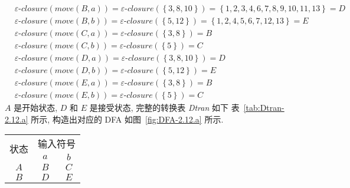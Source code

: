 \documentclass[boxes]{homework}
\begin{document}
\begin{solution}
\begin{align}
         & \varepsilon\textrm{-}closure \left( move \left( B, a\right)\right)
        = \varepsilon\textrm{-}closure \left( \left\{ 3, 8, 10\right\}\right)
        = \left\{ 1, 2, 3, 4, 6, 7, 8, 9, 10, 11, 13\right\} = D                  \\
         & \varepsilon\textrm{-}closure \left( move \left( B, b\right)\right)
        = \varepsilon\textrm{-}closure \left( \left\{ 5, 12\right\}\right)
        = \left\{ 1, 2, 4, 5, 6, 7, 12, 13\right\} = E                            \\
         & \varepsilon\textrm{-}closure \left( move \left( C, a\right)\right)
        = \varepsilon\textrm{-}closure \left( \left\{ 3, 8\right\}\right) = B     \\
         & \varepsilon\textrm{-}closure \left( move \left( C, b\right)\right)
        = \varepsilon\textrm{-}closure \left( \left\{ 5\right\}\right) = C        \\
         & \varepsilon\textrm{-}closure \left( move \left( D, a\right)\right)
        = \varepsilon\textrm{-}closure \left( \left\{ 3, 8, 10\right\}\right) = D \\
         & \varepsilon\textrm{-}closure \left( move \left( D, b\right)\right)
        = \varepsilon\textrm{-}closure \left( \left\{ 5, 12\right\}\right) = E    \\
         & \varepsilon\textrm{-}closure \left( move \left( E, a\right)\right)
        = \varepsilon\textrm{-}closure \left( \left\{ 3, 8\right\}\right) = B     \\
         & \varepsilon\textrm{-}closure \left( move \left( E, b\right)\right)
        = \varepsilon\textrm{-}closure \left( \left\{ 5\right\}\right) = C
    \end{align}
    $A$ 是开始状态, $D$ 和 $E$ 是接受状态, 完整的转换表 \textit{Dtran} 如下
    表~\ref{tab:Dtran-2.12.a} 所示, 构造出对应的 DFA 如图~\ref{fig:DFA-2.12.a}
    所示.
    \begin{table}[ht]
        \centering
        \begin{tabular}{c|cc}
            \hline
            \multicolumn{1}{c|}{\multirow{2}{*}{状态}} & \multicolumn{2}{c}{输入符号}       \\ \cline{2-3}
                                                       & \multicolumn{1}{c|}{$a$}     & $b$ \\ \hline
            $A$                                        & \multicolumn{1}{c|}{$B$}     & $C$ \\ \hline
            $B$                                        & \multicolumn{1}{c|}{$D$}     & $E$ \\ \hline

\end{tabular}
\end{table}
\end{solution}
\end{document}
